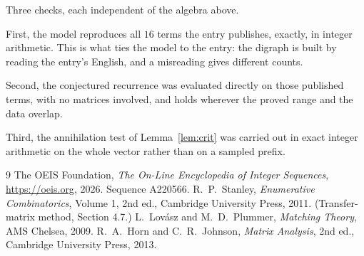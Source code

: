 \documentclass[11pt,a4paper]{article}
\theoremstyle{plain}
\theoremstyle{definition}
\begin{document}
Three checks, each independent of the algebra above.

First, the model reproduces all $16$ terms the entry publishes, exactly, in integer
arithmetic. This is what ties the model to the entry: the digraph is built by reading the
entry's English, and a misreading gives different counts.

Second, the conjectured recurrence was evaluated directly on those published terms, with no
matrices involved, and holds wherever the proved range and the data overlap.

Third, the annihilation test of Lemma~\ref{lem:crit} was carried out in exact integer
arithmetic on the whole vector rather than on a sampled prefix.

\begin{thebibliography}{9}
 The OEIS Foundation, \emph{The On-Line Encyclopedia of Integer
Sequences}, \url{https://oeis.org}, 2026. Sequence A220566.
 R.~P.~Stanley, \emph{Enumerative Combinatorics}, Volume 1, 2nd ed.,
Cambridge University Press, 2011. (Transfer-matrix method, Section 4.7.)
 L.~Lov\'asz and M.~D.~Plummer, \emph{Matching Theory}, AMS Chelsea,
2009.
 R.~A.~Horn and C.~R.~Johnson, \emph{Matrix Analysis}, 2nd ed., Cambridge
University Press, 2013.
\end{thebibliography}
\end{document}

